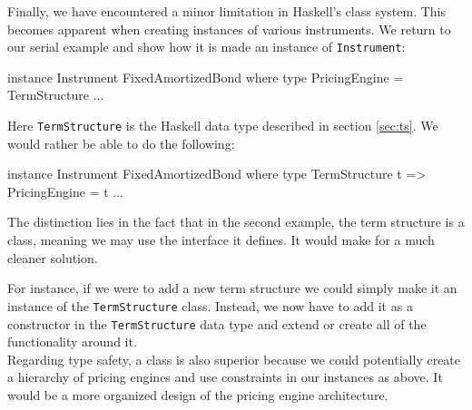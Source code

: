 Finally, we have encountered a minor limitation in Haskell's class system. This 
becomes apparent when creating instances of various instruments. We return to 
our serial example and show how it is made an instance of \texttt{Instrument}:

\begin{hscode}
instance Instrument FixedAmortizedBond where
  type PricingEngine = TermStructure
  ...
\end{hscode}

Here \texttt{TermStructure} is the Haskell data type described in section 
\ref{sec:ts}. We would rather be able to do the following:
 
\begin{hscode}
instance Instrument FixedAmortizedBond where
  type TermStructure t => PricingEngine = t
  ...
\end{hscode}

The distinction lies in the fact that in the second example, the term structure
is a class, meaning we may use the interface it defines. It would make for a much
cleaner solution.

For instance, if we were to add a new term structure we could simply make it
an instance of the \texttt{TermStructure} class. Instead, we now have to add it as a 
constructor in the \texttt{TermStructure} data type and extend or create all of
the functionality around it.\\

Regarding type safety, a class is also superior because we could potentially
create a hierarchy of pricing engines and use constraints in our instances as 
above. It would be a more organized design of the pricing engine architecture.

%




